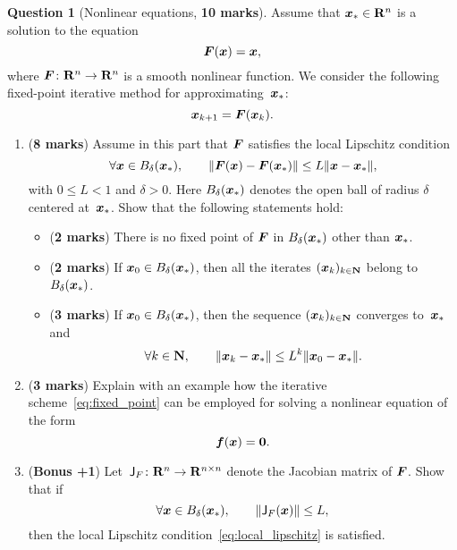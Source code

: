 \documentclass[11pt]{article}
\theoremstyle{definition}
\newtheorem{question}{Question}
\begin{document}
\newpage
\begin{question}
    [Nonlinear equations, \textbf{10 marks}]
    Assume that $\mathbf{\boldsymbol{x}}_* \in \mathbf R^n$ is a solution to the equation
    \[
        \mathbf{\boldsymbol{F}}(\mathbf{\boldsymbol{x}}) = \mathbf{\boldsymbol{x}},
    \]
    where $\mathbf{\boldsymbol{F}}\colon \mathbf R^n \to \mathbf R^n$ is a smooth nonlinear function.
    We consider the following fixed-point iterative method for approximating~$\mathbf{\boldsymbol{x}}_*$:
    \begin{equation}
        \label{eq:fixed_point}
        \mathbf{\boldsymbol{x}}_{k+1} = \mathbf{\boldsymbol{F}}(\mathbf{\boldsymbol{x}}_k).
    \end{equation}
    \begin{enumerate}
        \item
            (\textbf{8 marks})
            Assume in this part that $\mathbf{\boldsymbol{F}}$ satisfies the local Lipschitz condition
            \begin{equation}
                \label{eq:local_lipschitz}
                \forall \vect x \in B_{\delta}(\vect x_*), \qquad
                \norm[big]{\vect F(\vect x) - \vect F(\vect x_*)} \leq L \norm{\vect x - \vect x_*},
            \end{equation}
            with $0 \leq L < 1$ and $\delta > 0$.
            Here $B_{\delta}(\mathbf{\boldsymbol{x}}_*)$ denotes the open ball of radius $\delta$ centered at~$\mathbf{\boldsymbol{x}}_*$.
            Show that the following statements hold:
            \begin{itemize}
                \item (\textbf{2 marks}) There is no fixed point of $\mathbf{\boldsymbol{F}}$ in $B_{\delta}(\mathbf{\boldsymbol{x}}_*)$ other than $\mathbf{\boldsymbol{x}}_*$.
                \item (\textbf{2 marks}) If $\mathbf{\boldsymbol{x}}_0 \in B_{\delta}(\mathbf{\boldsymbol{x}}_*)$, then all the iterates $(\mathbf{\boldsymbol{x}}_k)_{k \in \mathbf N}$ belong to $B_{\delta}(\mathbf{\boldsymbol{x}}_*)$.
                \item (\textbf{3 marks}) If $\mathbf{\boldsymbol{x}}_0 \in B_{\delta}(\mathbf{\boldsymbol{x}}_*)$, then the sequence $(\mathbf{\boldsymbol{x}}_k)_{k \in \mathbf N}$ converges to~$\mathbf{\boldsymbol{x}}_*$ and
                    \[
                        \forall k \in \mathbf N, \qquad
                        \lVert\mathbf{\boldsymbol{x}}_k - \mathbf{\boldsymbol{x}}_*\rVert \leq L^k \lVert\mathbf{\boldsymbol{x}}_0 - \mathbf{\boldsymbol{x}}_*\rVert.
                    \]
            \end{itemize}

        \item
            (\textbf{3 marks})
            Explain with an example how the iterative scheme~\eqref{eq:fixed_point} can be employed for solving a nonlinear equation of the form
            \[
                \mathbf{\boldsymbol{f}}(\mathbf{\boldsymbol{x}}) = \mathbf{\boldsymbol{0}}.
            \]

        \item
            (\textbf{Bonus +1})
            Let~$\mathsf J_F\colon \mathbf R^n \to \mathbf R^{n\times n}$ denote the Jacobian matrix of $\mathbf{\boldsymbol{F}}$.
            Show that if
            \begin{equation*}
                \forall \vect x \in B_{\delta}(\vect x_*), \qquad
                \norm[big]{\mat J_F(\vect x)} \leq L,
            \end{equation*}
            then the local Lipschitz condition~\eqref{eq:local_lipschitz} is satisfied.
    \end{enumerate}
\end{question}
\end{document}
